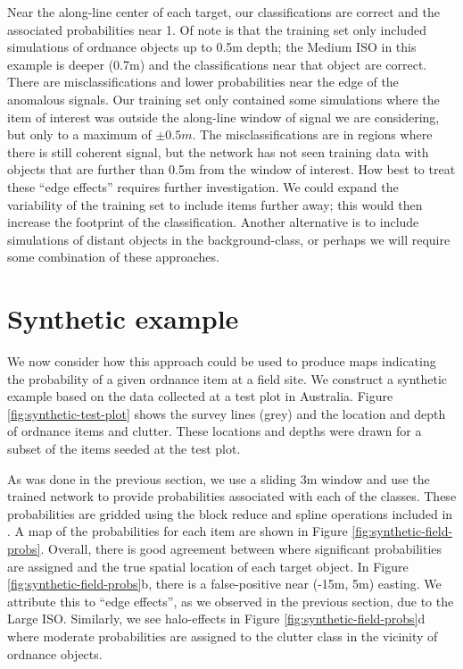 \documentclass{segabs}
\begin{document}
Near the along-line center of each target, our classifications are correct and the associated probabilities near 1. Of note is that the training set only included simulations of ordnance objects up to 0.5m depth; the Medium ISO in this example is deeper (0.7m) and the classifications near that object are correct. There are misclassifications and lower probabilities near the edge of the anomalous signals. Our training set only contained some simulations where the item of interest was outside the along-line window of signal we are considering, but only to a maximum of $\pm 0.5m$. The misclassifications are in regions where there is still coherent signal, but the network has not seen training data with objects that are further than 0.5m from the window of interest. How best to treat these ``edge effects'' requires further investigation. We could expand the variability of the training set to include items further away; this would then increase the footprint of the classification. Another alternative is to include simulations of distant objects in the background-class, or perhaps we will require some combination of these approaches.





\section{Synthetic example}

We now consider how this approach could be used to produce maps indicating the probability of a given ordnance item at a field site. We construct a synthetic example based on the data collected at a test plot in Australia. Figure \ref{fig:synthetic-test-plot} shows the survey lines (grey) and the location and depth of ordnance items and clutter. These locations and depths were drawn for a subset of the items seeded at the test plot.

As was done in the previous section, we use a sliding 3m window and use the trained network to provide probabilities associated with each of the classes. These probabilities are gridded using the block reduce and spline operations included in   \citep{Uieda2018}. A map of the probabilities for each item are shown in Figure \ref{fig:synthetic-field-probs}. Overall, there is good agreement between where significant probabilities are assigned and the true spatial location of each target object. In Figure \ref{fig:synthetic-field-probs}b, there is a false-positive near (-15m, 5m) easting. We attribute this to ``edge effects'', as we observed in the previous section, due to the Large ISO. Similarly, we see halo-effects in Figure \ref{fig:synthetic-field-probs}d where moderate probabilities are assigned to the clutter class in the vicinity of ordnance objects.

\end{document}
